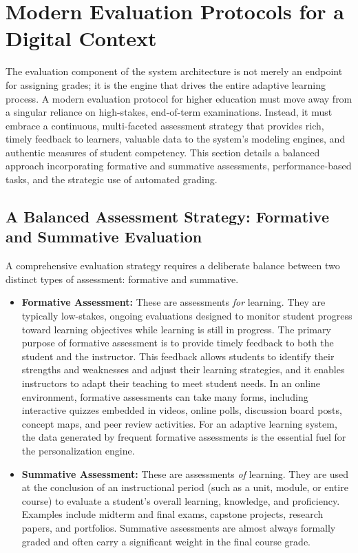 \documentclass{article}
\begin{document}
\section{Modern Evaluation Protocols for a Digital Context}

The evaluation component of the system architecture is not merely an endpoint for assigning grades; it is the engine that drives the entire adaptive learning process. A modern evaluation protocol for higher education must move away from a singular reliance on high-stakes, end-of-term examinations. Instead, it must embrace a continuous, multi-faceted assessment strategy that provides rich, timely feedback to learners, valuable data to the system's modeling engines, and authentic measures of student competency. This section details a balanced approach incorporating formative and summative assessments, performance-based tasks, and the strategic use of automated grading.

\subsection{A Balanced Assessment Strategy: Formative and Summative Evaluation}

A comprehensive evaluation strategy requires a deliberate balance between two distinct types of assessment: formative and summative.

\begin{itemize}
    \item \textbf{Formative Assessment:} These are assessments \textit{for} learning. They are typically low-stakes, ongoing evaluations designed to monitor student progress toward learning objectives while learning is still in progress.\cite{90, 91, 92} The primary purpose of formative assessment is to provide timely feedback to both the student and the instructor. This feedback allows students to identify their strengths and weaknesses and adjust their learning strategies, and it enables instructors to adapt their teaching to meet student needs.\cite{93, 94} In an online environment, formative assessments can take many forms, including interactive quizzes embedded in videos, online polls, discussion board posts, concept maps, and peer review activities.\cite{91, 92} For an adaptive learning system, the data generated by frequent formative assessments is the essential fuel for the personalization engine.\cite{92}
    \item \textbf{Summative Assessment:} These are assessments \textit{of} learning. They are used at the conclusion of an instructional period (such as a unit, module, or entire course) to evaluate a student's overall learning, knowledge, and proficiency.\cite{90, 91} Examples include midterm and final exams, capstone projects, research papers, and portfolios.\cite{92} Summative assessments are almost always formally graded and often carry a significant weight in the final course grade.\cite{90}
\end{itemize}
\end{document}
